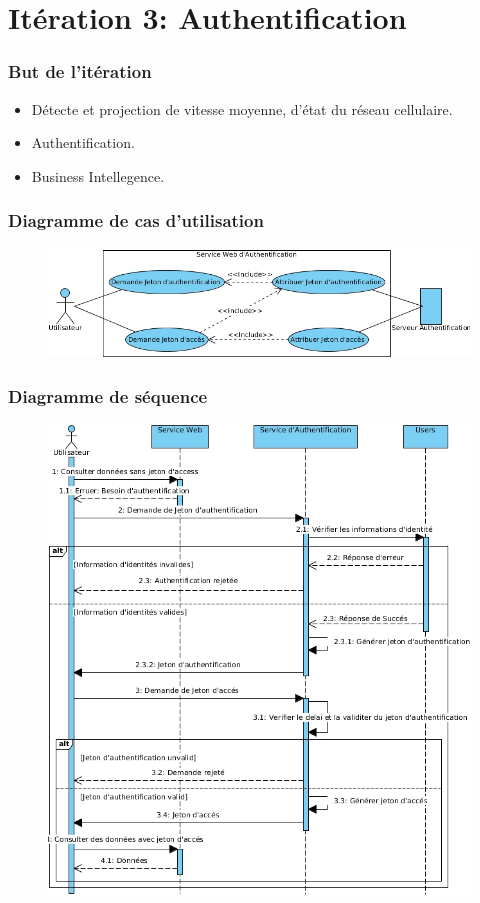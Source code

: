 \documentclass{beamer}
\begin{document}
\section{Itération 3: Authentification}
\begin{frame}
    \frametitle{But de l'itération}
    \begin{itemize}
        \item<1-> Détecte et projection de vitesse moyenne, d'état du réseau cellulaire.
        \item<2-> Authentification.
        \item<3-> Business Intellegence.
    \end{itemize}
\end{frame}
\begin{frame}
    \frametitle{Diagramme de cas d'utilisation}
    \begin{figure}
        \includegraphics[width=\textwidth]{./diagrams/sprint3-webservices-oauth-usecase}
    \end{figure}
\end{frame}
\begin{frame}
    \frametitle{Diagramme de séquence}
    \begin{figure}
        \includegraphics[width=.65\textwidth]{./diagrams/sprint3-webservices-oauth-sequence}
    \end{figure}
\end{frame}
\end{document}
